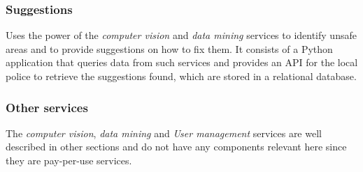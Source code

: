 \subsubsection{Suggestions}
Uses the power of the \textit{computer vision} and \textit{data mining} services to identify unsafe areas and to provide
suggestions on how to fix them. It consists of a Python application that queries data from such services and provides an API for the local police to retrieve the
suggestions found, which are stored in a relational database.

\subsubsection{Other services}
The \textit{computer vision}, \textit{data mining} and \textit{User management} services are well described in other sections and do not have any components relevant here since they are pay-per-use services.